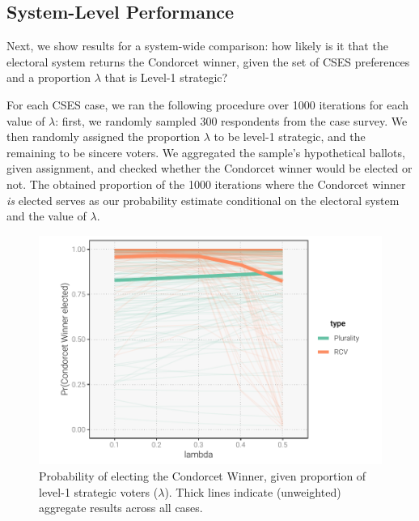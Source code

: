\documentclass[12pt, letter]{article}
\begin{document}
\subsection{System-Level Performance}

Next, we show results for a system-wide comparison: how likely is it that the electoral system returns the Condorcet winner, given the set of CSES preferences and a proportion $\lambda$ that is Level-1 strategic?

For each CSES case, we ran the following procedure over 1000 iterations for each value of $\lambda$: first, we randomly sampled 300 respondents from the case survey. We then randomly assigned the proportion $\lambda$ to be level-1 strategic, and the remaining to be sincere voters. We aggregated the sample's hypothetical ballots, given assignment, and checked whether the Condorcet winner would be elected or not. The obtained proportion of the 1000 iterations where the Condorcet winner \emph{is} elected serves as our probability estimate conditional on the electoral system and the value of $\lambda$.

\begin{figure}[!htb]
	\centering
	\includegraphics[width = 0.8 \textwidth]{../output/figures/condorcet_probs.pdf}
	\caption{Probability of electing the Condorcet Winner, given proportion of level-1 strategic voters ($\lambda$). Thick lines indicate (unweighted) aggregate results across all cases.}
	\label{fig:sv_condorcet}
\end{figure}
\end{document}
